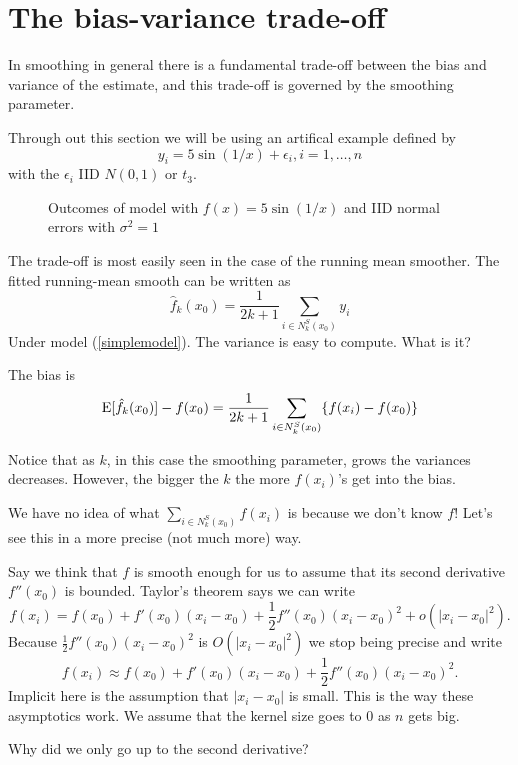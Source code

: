 \section{The bias-variance trade-off}

In smoothing in general there is a fundamental trade-off between the
bias and variance of the estimate, and this trade-off is governed by
the smoothing parameter. 

Through out this section we will be using an artifical example defined
by
\begin{equation}
\label{sinexample}
y_i = 5 \sin (1/x) + \epsilon_i, i=1,\dots,n
\end{equation}
with the $\epsilon_i$ IID $N(0,1)$ or $t_3$. 

\begin{figure}
\centerline{}
\caption{Outcomes of model with $f(x) = 5\sin(1/x)$ and IID normal
  errors with $\sigma^2=1$}
\end{figure}

The trade-off is most easily seen in the case of the running mean
smoother. The fitted running-mean smooth can be written as
\[
\hat{f}_k(x_0) = \frac{1}{2k+1} \sum_{i \in N^S_k(x_0)} y_i
\]
Under model (\ref{simplemodel}). The variance is easy to
compute. What is it? 

The bias is
\[
\mbox{E}[\hat{f}_k(x_0)] -f(x_0) =  \frac{1}{2k+1} \sum_{i \in N^S_k(x_0)}
\{ f(x_i) - f(x_0)   \}
\]


Notice that as $k$, in this case the smoothing parameter, grows the
variances decreases. However, the bigger the $k$ the more $f(x_i)$'s
get into the bias.

We have no idea of what $\sum_{i \in N^S_k(x_0)} f(x_i)$ is
because we don't know $f$! Let's see this in a more precise (not
much more) way. 


Say we think that $f$ is smooth enough for us to assume that its second
derivative $f''(x_0)$ is bounded. Taylor's theorem says we can write 
\[
f(x_i) = f(x_0) + f'(x_0) (x_i - x_0) + \frac{1}{2}f''(x_0)(x_i-x_0)^2 +
o(|x_i-x_0|^2).
\]
Because $ \frac{1}{2}f''(x_0)(x_i-x_0)^2$ is $O(|x_i-x_0|^2)$ we stop
being precise and write 
\[
f(x_i) \approx f(x_0) + f'(x_0) (x_i - x_0) + \frac{1}{2}f''(x_0)(x_i-x_0)^2.
\]
Implicit here is the assumption that $|x_i-x_0|$ is small. This is the
way these asymptotics work. We assume that the kernel size
goes to 0 as $n$ gets big. 


Why did we only go up to the second derivative?

